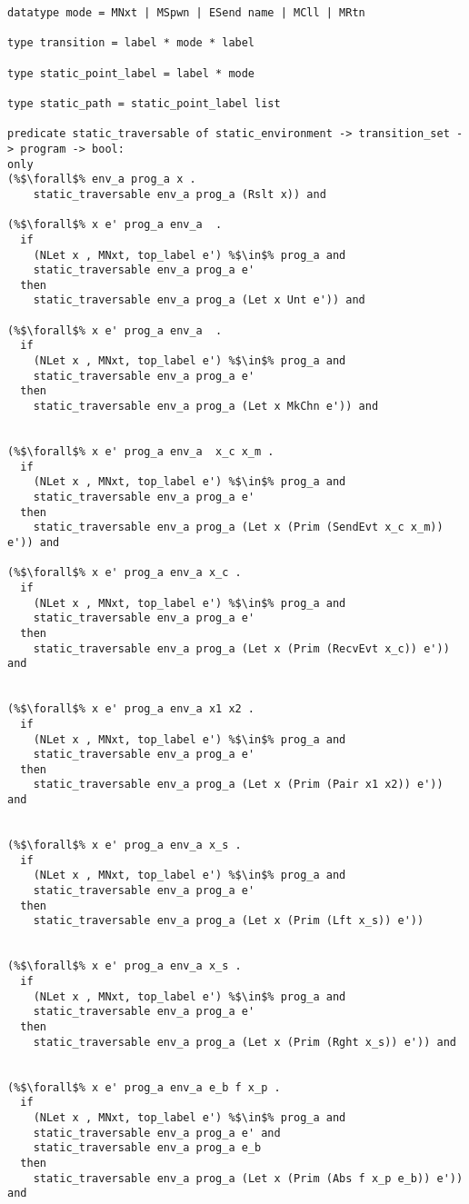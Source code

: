 \documentclass{article}
\begin{document}
\begin{lstlisting}[language=logic, style=codestyle1, escapechar=\%]
datatype mode = MNxt | MSpwn | ESend name | MCll | MRtn

type transition = label * mode * label

type static_point_label = label * mode

type static_path = static_point_label list

predicate static_traversable of static_environment -> transition_set -> program -> bool:
only
(%$\forall$% env_a prog_a x .
    static_traversable env_a prog_a (Rslt x)) and

(%$\forall$% x e' prog_a env_a  .
  if
    (NLet x , MNxt, top_label e') %$\in$% prog_a and
    static_traversable env_a prog_a e'
  then
    static_traversable env_a prog_a (Let x Unt e')) and

(%$\forall$% x e' prog_a env_a  .
  if
    (NLet x , MNxt, top_label e') %$\in$% prog_a and
    static_traversable env_a prog_a e'
  then
    static_traversable env_a prog_a (Let x MkChn e')) and


(%$\forall$% x e' prog_a env_a  x_c x_m .
  if
    (NLet x , MNxt, top_label e') %$\in$% prog_a and
    static_traversable env_a prog_a e'
  then
    static_traversable env_a prog_a (Let x (Prim (SendEvt x_c x_m)) e')) and

(%$\forall$% x e' prog_a env_a x_c .
  if
    (NLet x , MNxt, top_label e') %$\in$% prog_a and
    static_traversable env_a prog_a e'
  then
    static_traversable env_a prog_a (Let x (Prim (RecvEvt x_c)) e')) and


(%$\forall$% x e' prog_a env_a x1 x2 .
  if
    (NLet x , MNxt, top_label e') %$\in$% prog_a and
    static_traversable env_a prog_a e'
  then
    static_traversable env_a prog_a (Let x (Prim (Pair x1 x2)) e')) and


(%$\forall$% x e' prog_a env_a x_s .
  if
    (NLet x , MNxt, top_label e') %$\in$% prog_a and
    static_traversable env_a prog_a e'
  then
    static_traversable env_a prog_a (Let x (Prim (Lft x_s)) e'))


(%$\forall$% x e' prog_a env_a x_s .
  if
    (NLet x , MNxt, top_label e') %$\in$% prog_a and
    static_traversable env_a prog_a e'
  then
    static_traversable env_a prog_a (Let x (Prim (Rght x_s)) e')) and


(%$\forall$% x e' prog_a env_a e_b f x_p .
  if
    (NLet x , MNxt, top_label e') %$\in$% prog_a and
    static_traversable env_a prog_a e' and
    static_traversable env_a prog_a e_b
  then
    static_traversable env_a prog_a (Let x (Prim (Abs f x_p e_b)) e')) and


\end{lstlisting}
\end{document}
